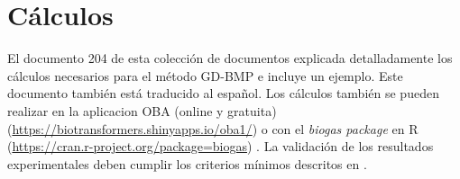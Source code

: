 \documentclass[]{article}
\begin{document}
\section{Cálculos}
El documento 204 de esta colección de documentos \citep{BMPdoc204gasdens} explicada detalladamente los cálculos necesarios para el método GD-BMP e incluye un ejemplo. Este documento también está traducido al español.
Los cálculos también se pueden realizar en la aplicacion OBA (online y gratuita)  (\url{https://biotransformers.shinyapps.io/oba1/}) o con el \textit{biogas package} en R (\url{https://cran.r-project.org/package=biogas}) \citep{hafnerSoftwareBiogasResearch2018}.
La validación de los resultados experimentales deben cumplir los criterios mínimos descritos en \citep{BMPdoc100req}.


\end{document}
